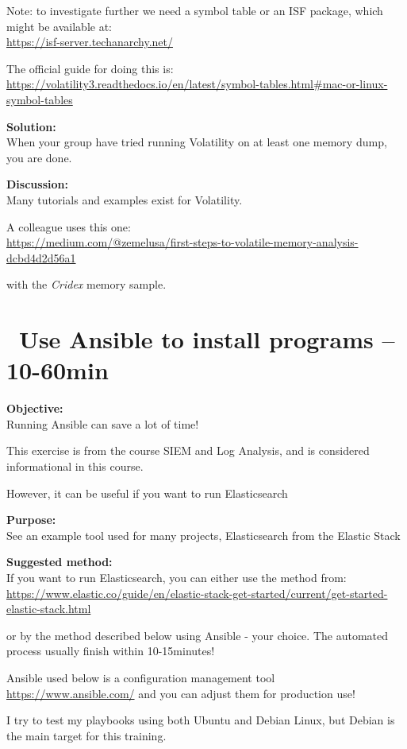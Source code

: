 \documentclass[a4paper,11pt,notitlepage]{report}
\begin{document}
Note: to investigate further we need a symbol table or an ISF package, which might be available at:\\
\url{https://isf-server.techanarchy.net/}

The official guide for doing this is:
\url{https://volatility3.readthedocs.io/en/latest/symbol-tables.html#mac-or-linux-symbol-tables}

{\bf Solution:}\\
When your group have tried running Volatility on at least one memory dump, you are done.

{\bf Discussion:}\\
Many tutorials and examples exist for Volatility.

A colleague uses this one:\\
\url{https://medium.com/@zemelusa/first-steps-to-volatile-memory-analysis-dcbd4d2d56a1}

with the \emph{Cridex} memory sample.



\chapter{\faInfoCircle\ Use Ansible to install programs -- 10-60min}
\label{ex:basicansible}


{\bf Objective:}\\
Running Ansible can save a lot of time!

This exercise is from the course SIEM and Log Analysis, and is considered informational in this course.

However, it can be useful if you want to run Elasticsearch

{\bf Purpose:}\\
See an example tool used for many projects, Elasticsearch from the Elastic Stack

{\bf Suggested method:}\\
If you want to run Elasticsearch, you can either use the method from:\\{\footnotesize
\url{https://www.elastic.co/guide/en/elastic-stack-get-started/current/get-started-elastic-stack.html}}

or by the method described below using Ansible - your choice. The automated process usually finish within 10-15minutes!

Ansible used below is a configuration management tool \url{https://www.ansible.com/} and you can adjust them for production use!

I try to test my playbooks using both Ubuntu and Debian Linux, but Debian is the main target for this training.
\end{document}
